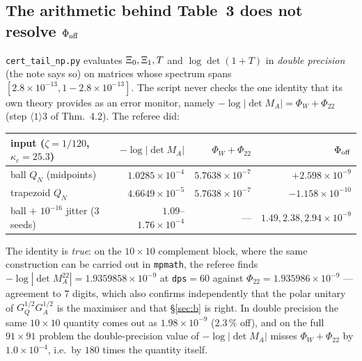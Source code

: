 \documentclass[11pt]{article}
\begin{document}
\subsection{The arithmetic behind Table~3 does not resolve $\Phi_{\rm off}$}\label{ss:noise}

\texttt{cert\_tail\_np.py} evaluates $\Xi_0,\Xi_1,T$ and $\log\det(1+T)$ in \emph{double precision}
(the note says so) on matrices whose spectrum spans $[2.8\times10^{-13},1-2.8\times10^{-13}]$.  The
script never checks the one identity that its own theory provides as an error monitor, namely
$-\log|\det M_A|=\Phi_W+\Phi_{22}$ (step $\langle1\rangle3$ of Thm.~4.2).  The referee did:
\begin{center}\small
\begin{tabular}{l r r r}\toprule
input ($\zeta=1/120$, $\kappa_c=25.3$) & $-\log|\det M_A|$ & $\Phi_W+\Phi_{22}$ & $\Phi_{\rm off}$\\\midrule
ball $Q_N$ (midpoints)              & $1.0285\times10^{-4}$ & $5.7638\times10^{-7}$ & $+2.598\times10^{-9}$\\
trapezoid $Q_N$                     & $4.6649\times10^{-5}$ & $5.7638\times10^{-7}$ & $-1.158\times10^{-10}$\\
ball $+$ $10^{-16}$ jitter (3 seeds)& $1.09$--$1.76\times10^{-4}$ & --- & $1.49,2.38,2.94\times10^{-9}$\\
\bottomrule\end{tabular}
\end{center}
The identity is \emph{true}: on the $10\times10$ complement block, where the same construction can be
carried out in \texttt{mpmath}, the referee finds $-\log|\det M_A^{22}|=1.9359858\times10^{-9}$ at
\texttt{dps}$=60$ against $\Phi_{22}=1.935986\times10^{-9}$ --- agreement to $7$ digits, which also
confirms independently that the polar unitary of $G_Q^{1/2}G_A^{1/2}$ is the maximiser and that
\S\ref{sec:b} is right.  In double precision the same $10\times10$ quantity comes out as
$1.98\times10^{-9}$ ($2.3\,\%$ off), and on the full $91\times91$ problem the double-precision value
of $-\log|\det M_A|$ misses $\Phi_W+\Phi_{22}$ by $1.0\times10^{-4}$, i.e.\ by $180$ times the
quantity itself.
\end{document}
